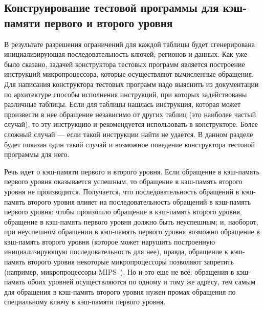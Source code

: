 \begin{enumerate}


\section{Конструирование тестовой программы для кэш-памяти первого и второго
уровня}\label{sec:L1L2_initialization}

В результате разрешения ограничений для каждой таблицы будет сгенерирована инициализирующая последовательность ключей, регионов и данных. Как уже было сказано, задачей
конструктора тестовых программ является построение инструкций микропроцессора,
которые осуществляют вычисленные обращения. Для написания конструктора тестовых
программ надо выяснить из документации по архитектуре способы исполнения
инструкций, при которых задействованы различные таблицы. Если для таблицы
нашлась инструкция, которая может произвести в нее обращение независимо от
других таблиц (это наиболее частый случай), то эту инструкцию и рекомендуется использовать в конструкторе. Более сложный
случай --- если такой инструкции найти не удается. В данном разделе будет
показан один такой случай и возможное поведение конструктора тестовой программы
для него.

Речь идет о кэш-памяти первого и второго уровня. Если обращение в кэш-память
первого уровня оказывается успешным, то обращение в кэш-память
второго уровня не производится. Получается, что последовательность обращений в
кэш-память второго уровня влияет на последовательность обращений в кэш-память
первого уровня: чтобы произошло обращение в кэш-память второго уровня, обращение
в кэш-память первого уровня должно быть неуспешным; и, наоборот, при неуспешном
обращении в кэш-память первого уровня возможно обращение в кэш-память второго
уровня (которое может нарушить построенную инициализирующую последовательность
для нее), правда, обращение к кэш-память второго уровня некоторые
микропроцессоры позволяют запретить (например, микропроцессоры
MIPS~\cite{mips64III}). Но и это еще не всё: обращения в кэш-память обоих
уровней осуществляются по одному и тому же адресу, тем самым для обращения в
кэш-память второго уровня нужен промах обращения по специальному ключу в
кэш-памяти первого уровня.


\end{enumerate}
